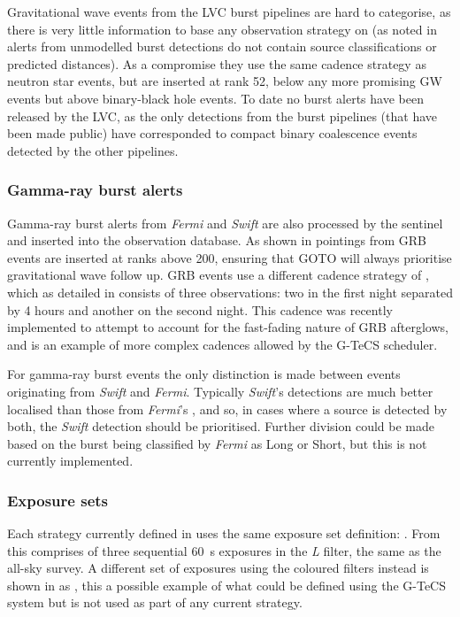 \begin{colsection}
\begin{colsection}
Gravitational wave events from the LVC burst pipelines \citep{GW_burst} are hard to categorise, as there is very little information to base any observation strategy on (as noted in  alerts from unmodelled burst detections do not contain source classifications or predicted distances). As a compromise they use the same cadence strategy as neutron star events, but are inserted at rank 52, below any more promising GW events but above binary-black hole events. To date no burst alerts have been released by the LVC, as the only detections from the burst pipelines (that have been made public) have corresponded to compact binary coalescence events detected by the other pipelines.

\subsubsection{Gamma-ray burst alerts}

Gamma-ray burst alerts from \textit{Fermi} and \textit{Swift} are also processed by the sentinel and inserted into the observation database. As shown in  pointings from GRB events are inserted at ranks above 200, ensuring that GOTO will always prioritise gravitational wave follow up. GRB events use a different cadence strategy of , which as detailed in  consists of three observations: two in the first night separated by 4 hours and another on the second night. This cadence was recently implemented to attempt to account for the fast-fading nature of GRB afterglows, and is an example of more complex cadences allowed by the G-TeCS scheduler.

For gamma-ray burst events the only distinction is made between events originating from \textit{Swift} and \textit{Fermi}. Typically \textit{Swift}'s  detections are much better localised than those from \textit{Fermi}'s , and so, in cases where a source is detected by both, the \textit{Swift} detection should be prioritised. Further division could be made based on the burst being classified by \textit{Fermi} as Long or Short, but this is not currently implemented.

\subsubsection{Exposure sets}

Each strategy currently defined in  uses the same exposure set definition: . From  this comprises of three sequential \SI{60}{\second} exposures in the \textit{L} filter, the same as the all-sky survey. A different set of exposures using the coloured filters instead is shown in  as , this a possible example of what could be defined using the G-TeCS system  but is not used as part of any current strategy.  %


\end{colsection}
\end{colsection}
